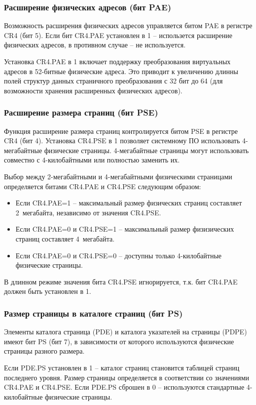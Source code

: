 \subsubsection*{Расширение физических адресов (бит PAE)}
Возможность расширения физических адресов управляется битом PAE в регистре CR4 (бит 5). Если бит CR4.PAE
установлен в 1 -- использется расширение физических адресов, в противном случае -- не используется.

Установка CR4.PAE в 1 включает поддержку преобразования виртуальных адресов в 52-битные физические адреса.
Это приводит к увеличению длинны полей структур данных страничного преобразования с 32 бит до 64 (для
возможности хранения расширенных физических адресов).

\subsubsection*{Расширение размера страниц (бит PSE)}
Функция расширение размера страниц контролируется битом PSE в регистре CR4 (бит 4). Установка CR4.PSE в 1
позволяет системному ПО использовать 4-мегабайтные физические страницы. 4-мегабайтные страницы могут
использовать совместно с 4-килобайтными или полностью заменить их.

Выбор между 2-мегабайтными и 4-мегабайтными физическими страницами определяется битами CR4.PAE и CR4.PSE
следующим образом:
\begin{itemize}
\item Если CR4.PAE=1 -- максимальный размер физических страниц составляет 2~мегабайта, независимо от значения CR4.PSE.
\item Если CR4.PAE=0 и CR4.PSE=1 -- максимальный размер физизических страниц составляет 4~мегабайта.
\item Если CR4.PAE=0 и CR4.PSE=0 -- доступны только 4-килобайтные физические страницы.
\end{itemize}

В длинном режиме значения бита CR4.PSE игнорируется, т.к. бит CR4.PAE должен быть установлен в 1.

\subsubsection*{Размер страницы в каталоге страниц (бит PS)}
Элементы каталога страница (PDE) и каталога указателей на страницы (PDPE) имеют бит PS (бит 7),
в зависимости от которого используются физические страницы разного размера.

Если PDE.PS установлен в 1 -- каталог страниц становится таблицей страниц последнего уровня.
Размер страницы определяется в соответствии со значениями CR4.PAE и CR4.PSE. Если PDE.PS сброшен в 0 --
используются стандартные 4-килобайтные физические страницы.

